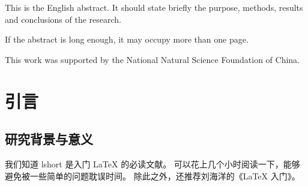 \documentclass{ncubachelor}
\begin{document}
\maketitle

\makedecaut

\frontmatter

\begin{abstract}
这是中文摘要。摘要应扼要说明研究目的、方法、结果和结论，
内容为小四号宋体、两端对齐、行距 1.35 倍、行首缩进 2 个汉字字符。

如果摘要较长，可以分段书写，也可以写到第二页。

本文得到了国家自然科学基金项目的资助。
\end{abstract}

\begin{abstract*}
This is the English abstract. It should state briefly the purpose,
methods, results and conclusions of the research.

If the abstract is long enough, it may occupy more than one page.

This work was supported by the National Natural Science Foundation
of China.
\end{abstract*}

\tableofcontents

\mainmatter

\chapter{引言}\label{chap:intro}


\section{研究背景与意义}\label{sec:background}

我们知道 lshort\cite{lshortcn} 是入门 \LaTeX{} 的必读文献。
可以花上几个小时阅读一下，能够避免被一些简单的问题耽误时间。
除此之外，还推荐刘海洋的《\LaTeX{} 入门》。
\end{document}
